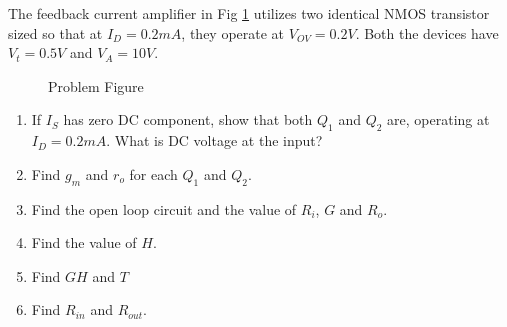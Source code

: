 The feedback current amplifier in Fig \ref{fig:ee18btech11038_probfig} utilizes two identical NMOS transistor sized so that at $I_{D} = 0.2mA$, they operate at $V_{OV} = 0.2V$. Both the devices have $V_{t} =0.5V$ and $V_{A} = 10V$.
\begin{figure}[!ht]
	\begin{center}
		
		\resizebox{\columnwidth}{!}{}
	\end{center}
\caption{Problem Figure}
\label{fig:ee18btech11038_probfig}
\end{figure}
\begin{enumerate}


\item  If $I_{S}$ has zero DC component, show that both $Q_{1}$ and $Q_{2}$ are, operating at $I_{D} = 0.2mA$. What is DC voltage at the input?
\\
\item Find $g_{m}$ and $r_{o}$ for each $Q_{1}$ and $Q_{2}$.
\\
\item  Find the open loop circuit and the value of $R_{i}$, $G$ and $R_{o}$.
\\
\item  Find the value of $H$.
\\
\item  Find $GH$ and $T$
\\
\item Find $R_{in}$ and $R_{out}$.
\end{enumerate}
